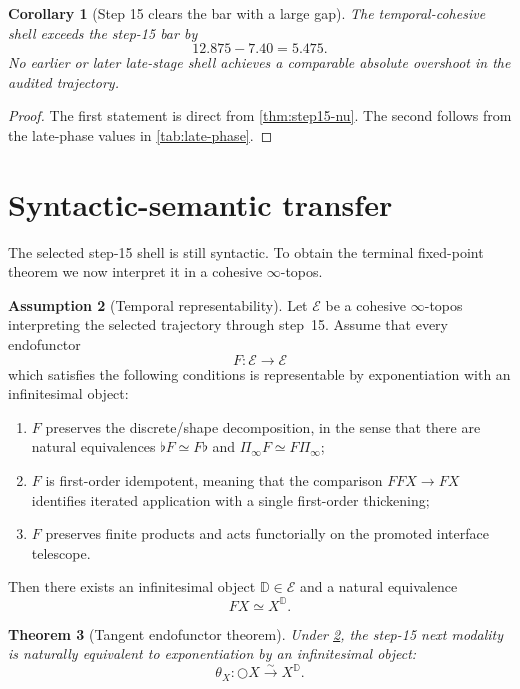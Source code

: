 \documentclass[11pt]{article}
\theoremstyle{plain}
\newtheorem{theorem}{Theorem}[section]
\newtheorem{corollary}[theorem]{Corollary}
\theoremstyle{definition}
\newtheorem{assumption}[theorem]{Assumption}
\theoremstyle{remark}
\newcommand{\D}{\mathbb{D}}
\newcommand{\Shape}{\Pi_{\!\infty}}
\begin{document}
\begin{corollary}[Step 15 clears the bar with a large gap]
\label{cor:step15-gap}
The temporal-cohesive shell exceeds the step-15 bar by
\[
  12.875-7.40 = 5.475.
\]
No earlier or later late-stage shell achieves a comparable absolute overshoot in the audited trajectory.
\end{corollary}

\begin{proof}
The first statement is direct from \cref{thm:step15-nu}. The second follows from the late-phase values in \cref{tab:late-phase}.
\end{proof}

\section{Syntactic-semantic transfer}

The selected step-15 shell is still syntactic. To obtain the terminal fixed-point theorem we now interpret it in a cohesive $\infty$-topos.

\begin{assumption}[Temporal representability]
\label{ass:representability}
Let $\mathcal E$ be a cohesive $\infty$-topos interpreting the selected trajectory through step~15. Assume that every endofunctor
\[
  F:\mathcal E\to\mathcal E
\]
which satisfies the following conditions is representable by exponentiation with an infinitesimal object:
\begin{enumerate}
    \item $F$ preserves the discrete/shape decomposition, in the sense that there are natural equivalences $\flat F\simeq F\flat$ and $\Shape F\simeq F\Shape$;
    \item $F$ is first-order idempotent, meaning that the comparison $FFX\to FX$ identifies iterated application with a single first-order thickening;
    \item $F$ preserves finite products and acts functorially on the promoted interface telescope.
\end{enumerate}
Then there exists an infinitesimal object $\D\in\mathcal E$ and a natural equivalence
\[
  FX\simeq X^\D.
\]
\end{assumption}

\begin{theorem}[Tangent endofunctor theorem]
\label{thm:tangent-endofunctor}
Under \cref{ass:representability}, the step-15 next modality is naturally equivalent to exponentiation by an infinitesimal object:
\[
  \theta_X:\bigcirc X\overset{\sim}{\longrightarrow} X^\D.
\]
\end{theorem}
\end{document}
